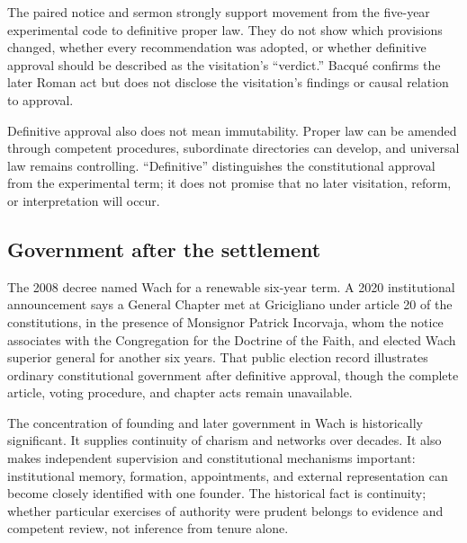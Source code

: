 The paired notice and sermon strongly support movement from the five-year experimental code to definitive proper law. They do not show which provisions changed, whether every recommendation was adopted, or whether definitive approval should be described as the visitation's ``verdict.'' Bacqué confirms the later Roman act but does not disclose the visitation's findings or causal relation to approval.

Definitive approval also does not mean immutability. Proper law can be amended through competent procedures, subordinate directories can develop, and universal law remains controlling. ``Definitive'' distinguishes the constitutional approval from the experimental term; it does not promise that no later visitation, reform, or interpretation will occur.

\subsection{Government after the settlement}

The 2008 decree named Wach for a renewable six-year term. A 2020 institutional announcement says a General Chapter met at Gricigliano under article 20 of the constitutions, in the presence of Monsignor Patrick Incorvaja, whom the notice associates with the Congregation for the Doctrine of the Faith, and elected Wach superior general for another six years. That public election record illustrates ordinary constitutional government after definitive approval, though the complete article, voting procedure, and chapter acts remain unavailable.

The concentration of founding and later government in Wach is historically significant. It supplies continuity of charism and networks over decades. It also makes independent supervision and constitutional mechanisms important: institutional memory, formation, appointments, and external representation can become closely identified with one founder. The historical fact is continuity; whether particular exercises of authority were prudent belongs to evidence and competent review, not inference from tenure alone.

